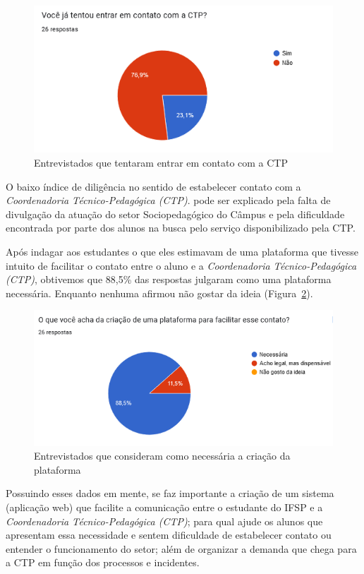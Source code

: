 \documentclass[12pt,a4paper]{article}
\begin{document}
\begin{figure}[H]
    \centering
    \includegraphics[width=14cm]{img3.png}
    \caption{Entrevistados que tentaram entrar em contato com a CTP}
    \label{fig03}
\end{figure}

O baixo índice de diligência no sentido de estabelecer contato com a \textit{Coordenadoria Técnico-Pedagógica (CTP)}. pode ser explicado pela falta de divulgação da atuação do setor Sociopedagógico do Câmpus e pela dificuldade encontrada por parte dos alunos na busca pelo serviço disponibilizado pela CTP.

Após indagar aos estudantes o que eles estimavam de uma plataforma que tivesse intuito de facilitar o contato entre o aluno e a \textit{Coordenadoria Técnico-Pedagógica (CTP)}, obtivemos que 88,5\% das respostas julgaram como uma plataforma necessária. Enquanto nenhuma afirmou não gostar da ideia (Figura~\ref{fig04}).

\begin{figure}[H]
    \centering
     \includegraphics[width=15cm]{img4.png}
    \caption{Entrevistados que consideram como necessária a criação da plataforma}
    \label{fig04}
\end{figure}

Possuindo esses dados em mente, se faz importante a criação de um sistema (aplicação web) que facilite a comunicação entre o estudante do IFSP e a \textit{Coordenadoria Técnico-Pedagógica (CTP)}; para qual ajude os alunos que apresentam essa necessidade e sentem dificuldade de estabelecer contato ou entender o funcionamento do setor; além de organizar a demanda que chega para a CTP em função dos processos e incidentes.
\end{document}
